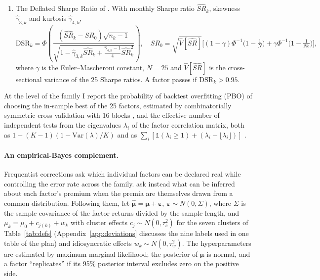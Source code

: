 \documentclass[11pt]{article}
\begin{document}
\begin{enumerate}[label=R\arabic*.]
\item The Deflated Sharpe Ratio of \citet{bailey2014deflated}. With monthly Sharpe ratio $\widehat{SR}_k$, skewness
$\hat\gamma_{3,k}$ and kurtosis $\hat\gamma_{4,k}$,
\begin{equation}
\mathrm{DSR}_k=\Phi\!\left(\frac{(\widehat{SR}_k-SR_0)\sqrt{n_k-1}}{\sqrt{1-\hat\gamma_{3,k}\widehat{SR}_k+\frac{\hat\gamma_{4,k}-1}{4}\widehat{SR}_k^2}}\right),\quad
SR_0=\sqrt{\widehat V[\widehat{SR}]}\Big[(1-\gamma)\Phi^{-1}\Big(1-\tfrac{1}{N}\Big)+\gamma\Phi^{-1}\Big(1-\tfrac{1}{Ne}\Big)\Big],
\end{equation}
where $\gamma$ is the Euler--Mascheroni constant, $N=25$ and $\widehat V[\widehat{SR}]$ is the cross-sectional variance
of the 25 Sharpe ratios. A factor passes if $\mathrm{DSR}_k>0.95$.
\end{enumerate}
At the level of the family I report the probability of backtest overfitting (PBO) of choosing the in-sample best of the
25 factors, estimated by combinatorially symmetric cross-validation with 16 blocks \citep{bailey2017probability}, and
the effective number of independent tests from the eigenvalues $\lambda_i$ of the factor correlation matrix, both as
$1+(K-1)(1-\mathrm{Var}(\lambda)/K)$ \citep{nyholt2004simple} and as $\sum_i[\mathbb 1(\lambda_i\ge1)+(\lambda_i-\lfloor\lambda_i\rfloor)]$
\citep{li2005adjusting}.

\paragraph{An empirical-Bayes complement.}
Frequentist corrections ask which individual factors can be declared real while controlling the error rate across the
family. \citet{jensen2023replication} ask instead what can be inferred about each factor's premium when the premia are
themselves drawn from a common distribution. Following them, let $\hat{\boldsymbol\mu}=\boldsymbol\mu+\boldsymbol\varepsilon$,
$\boldsymbol\varepsilon\sim N(0,\Sigma)$, where $\Sigma$ is the sample covariance of the factor returns divided by the
sample length, and $\mu_k=\mu_0+c_{j(k)}+w_k$ with cluster effects $c_j\sim N(0,\tau_c^2)$ for the seven clusters of
Table~\ref{tab:defs} (Appendix~\ref{app:deviations} discusses the nine labels used in one table of the plan) and
idiosyncratic effects $w_k\sim N(0,\tau_w^2)$. The hyperparameters are estimated by maximum
marginal likelihood; the posterior of $\boldsymbol\mu$ is normal, and a factor ``replicates'' if its 95\% posterior
interval excludes zero on the positive side.
\end{document}
